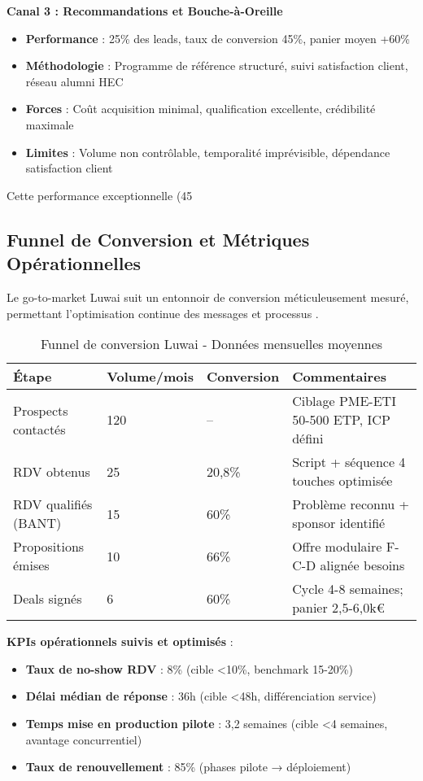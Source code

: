 \textbf{Canal 3 : Recommandations et Bouche-à-Oreille}
\begin{itemize}
    \item \textbf{Performance} : 25\% des leads, taux de conversion 45\%, panier moyen +60\%
    \item \textbf{Méthodologie} : Programme de référence structuré, suivi satisfaction client, réseau alumni HEC
    \item \textbf{Forces} : Coût acquisition minimal, qualification excellente, crédibilité maximale
    \item \textbf{Limites} : Volume non contrôlable, temporalité imprévisible, dépendance satisfaction client
\end{itemize}

Cette performance exceptionnelle (45%

\subsection{Funnel de Conversion et Métriques Opérationnelles}

Le go-to-market Luwai suit un entonnoir de conversion méticuleusement mesuré, permettant l'optimisation continue des messages et processus \cite{luwai2025funnel}.

\begin{table}[ht]
\centering
\caption{Funnel de conversion Luwai - Données mensuelles moyennes}
\label{tab:luwai_funnel}
\begin{tabular}{@{}p{5cm}p{3cm}p{3cm}p{4cm}@{}}
\toprule
\textbf{Étape} & \textbf{Volume/mois} & \textbf{Conversion} & \textbf{Commentaires} \\
\midrule
Prospects contactés & 120 & -- & Ciblage PME-ETI 50-500 ETP, ICP défini \\
RDV obtenus & 25 & 20,8\% & Script + séquence 4 touches optimisée \\
RDV qualifiés (BANT) & 15 & 60\% & Problème reconnu + sponsor identifié \\
Propositions émises & 10 & 66\% & Offre modulaire F-C-D alignée besoins \\
Deals signés & 6 & 60\% & Cycle 4-8 semaines; panier 2,5-6,0k€ \\
\bottomrule
\end{tabular}
\end{table}

\textbf{KPIs opérationnels suivis et optimisés} :
\begin{itemize}
    \item \textbf{Taux de no-show RDV} : 8\% (cible <10\%, benchmark 15-20\%)
    \item \textbf{Délai médian de réponse} : 36h (cible <48h, différenciation service)
    \item \textbf{Temps mise en production pilote} : 3,2 semaines (cible <4 semaines, avantage concurrentiel)
    \item \textbf{Taux de renouvellement} : 85\% (phases pilote → déploiement)
\end{itemize}


